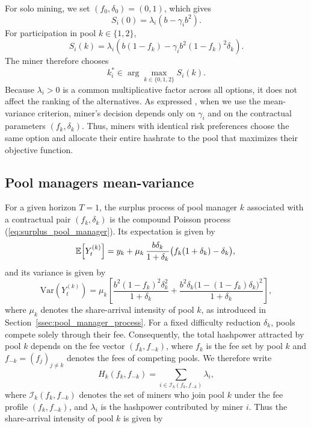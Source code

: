 For solo mining, we set $(f_0,\delta_0)=(0,1)$, which gives
\begin{equation*}
S_i(0)=\lambda_i\left(b-\gamma_i b^2\right).
\end{equation*}
For participation in pool $k\in\{1,2\}$,
\begin{equation*}
S_i(k)
=
\lambda_i\left(
b(1-f_k)-\gamma_i b^2(1-f_k)^2\delta_k
\right).
\end{equation*}
The miner therefore chooses
\begin{equation}\label{eq:miner_opti}
k_i^*\in\arg\max_{k\in\{0,1,2\}} S_i(k).
\end{equation}
Because $\lambda_i>0$ is a common multiplicative factor across all options, it does not affect the ranking of the alternatives. As expressed \citet{goffard2025hashpower}, when we use the mean-variance criterion, miner's decision depends only on $\gamma_i$ and on the contractual parameters $(f_k,\delta_k)$. Thus, miners with identical risk preferences choose the same option and allocate their entire hashrate to the pool that maximizes their objective function.

\subsection{Pool managers mean-variance}

For a given horizon $T=1$, the surplus process of pool manager $k$ associated with a contractual pair $(f_k,\delta_k)$ is the compound Poisson process (\ref{eq:surplus_pool_manager}). Its expectation is given by
\begin{equation}\label{eq:mean_pool_mana}
\mathbb{E}\!\left[Y_t^{(k)}\right]
=
y_k+\mu_k \,\frac{b\delta_k}{1+\delta_k}\big(f_k(1+\delta_k)-\delta_k\big),\\
\end{equation}
and its variance is given by
\begin{equation}\label{eq:var_pool_mana}
\mathrm{Var}\!\left(Y_t^{(k)}\right)
=
\mu_k 
\left[
\frac{b^2(1-f_k)^2\delta_k^2}{1+\delta_k}
+
\frac{b^2\delta_k\big(1-(1-f_k)\delta_k\big)^2}{1+\delta_k}
\right],
\end{equation}
where $\mu_k$ denotes the share-arrival intensity of pool $k$, as introduced in 
Section~\ref{ssec:pool_manager_process}. For a fixed difficulty reduction $\delta_k$, 
pools compete solely through their fee. Consequently, the total hashpower 
attracted by pool $k$ depends on the fee vector $(f_k, f_{-k})$, where $f_k$ is the 
fee set by pool $k$ and $f_{-k} = (f_j)_{j \neq k}$ denotes the fees of competing pools. 
We therefore write
\begin{equation}\label{eq:hashrate_f}
    H_k(f_k, f_{-k}) = \sum_{i \in \mathcal{I}_k(f_k, f_{-k})} \lambda_i,
\end{equation}
where $\mathcal{I}_k(f_k, f_{-k})$ denotes the set of miners who join pool $k$ under 
the fee profile $(f_k, f_{-k})$, and $\lambda_i$ is the hashpower contributed by miner $i$. Thus the share-arrival intensity of pool $k$ is given by

